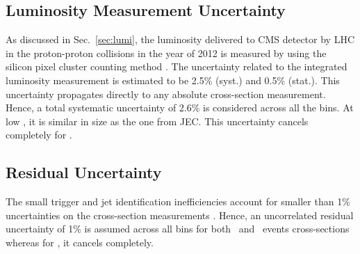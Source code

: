\subsection{Luminosity Measurement Uncertainty}
As discussed in Sec.~\ref{sec:lumi}, the luminosity delivered to CMS detector by LHC in the proton-proton collisions in the year of 2012 is measured by using the silicon pixel cluster counting method \cite{CMS:2013gfa}. The uncertainty related to the integrated luminosity measurement is estimated to be 2.5\% (syst.) and 0.5\% (stat.). This uncertainty propagates directly to any absolute cross-section measurement. Hence, a total systematic uncertainty of 2.6\% is considered across all the \httwo bins. At low \httwons, it is similar in size as the one from JEC. This uncertainty cancels completely for \ratio.

\subsection{Residual Uncertainty}
The small trigger and jet identification inefficiencies account for smaller than 1\% uncertainties on the cross-section measurements \cite{Khachatryan:2016mlc,Chatrchyan:2012bja}. Hence, an uncorrelated residual uncertainty of 1\% is assumed across all \httwo bins for both \njt~and \njth~events cross-sections whereas for \rations, it cancels completely.

